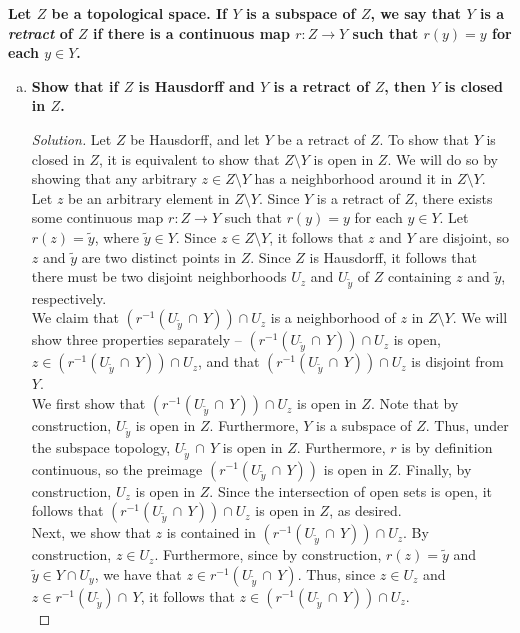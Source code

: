 \documentclass[11pt]{article}
\newenvironment{solution}
  {\renewcommand\qedsymbol{$\blacksquare$}\begin{proof}[Solution]}
  {\end{proof}}
\begin{document}
\textbf{Let $Z$ be a topological space. If $Y$ is a subspace of $Z$, we say that $Y$ is a \textit{retract} of $Z$ if there is a continuous map $r\colon Z \rightarrow Y$ such that $r(y) = y$ for each $y \in Y$.}
\begin{enumerate}[a)]
    \item \textbf{Show that if $Z$ is Hausdorff and $Y$ is a retract of $Z$, then $Y$ is closed in $Z$.}
    \begin{solution}
    Let $Z$ be Hausdorff, and let $Y$ be a retract of $Z$. To show that $Y$ is closed in $Z$, it is equivalent to show that $Z \setminus Y$ is open in $Z$. We will do so by showing that any arbitrary $z \in Z \setminus Y$ has a neighborhood around it in $Z \setminus Y$. \\

    Let $z$ be an arbitrary element in $Z \setminus Y$. Since $Y$ is a retract of $Z$, there exists some continuous map $r\colon Z \rightarrow Y$ such that $r(y) = y$ for each $y \in Y$. Let $r(z) = \tilde{y}$, where $\tilde{y} \in Y$. 
    Since $z \in Z \setminus Y$, it follows that $z$ and $Y$ are disjoint, so $z$ and $\tilde{y}$ are two distinct points in $Z$. Since $Z$ is Hausdorff, 
    it follows that there must be two disjoint neighborhoods $U_z$ and $U_{\tilde{y}}$ of $Z$ containing $z$ and $\tilde{y}$, respectively. \\

    We claim that $(r^{-1}(U_{\tilde{y}} \, \cap \, Y)) \cap U_z$ is a neighborhood of $z$ in $Z \setminus Y$. We will show three properties separately --  $(r^{-1}(U_{\tilde{y}} \, \cap \, Y)) \cap U_z$ is open, $z \in (r^{-1}(U_{\tilde{y}} \, \cap \, Y)) \cap U_z$, and that  $(r^{-1}(U_{\tilde{y}} \, \cap \, Y)) \cap U_z$ is disjoint from $Y$. \\

    We first show that $(r^{-1}(U_{\tilde{y}} \,\cap \, Y)) \cap U_z$ is open in $Z$. Note that by construction, $U_{\tilde{y}}$ is open in $Z$. Furthermore, $Y$ is a subspace of $Z$. Thus, under the subspace topology, $U_{\tilde{y}} \, \cap \, Y$ is open in $Z$. Furthermore,
    $r$ is by definition continuous, so the preimage $(r^{-1}(U_{\tilde{y}} \, \cap \, Y))$ is open in $Z$. Finally, by construction, $U_z$ is open in $Z$. Since the intersection of open sets is open, it follows that
    $(r^{-1}(U_{\tilde{y}} \, \cap \, Y)) \cap U_z$ is open in $Z$, as desired. \\

    Next, we show that $z$ is contained in $(r^{-1}(U_{\tilde{y}} \, \cap \, Y)) \cap U_z$. By construction, $z \in U_z$. Furthermore, since by construction, $r(z) = \tilde{y}$ and $\tilde{y} \in Y \cap U_y$, we have that
    $z \in r^{-1}(U_{\tilde{y}} \, \cap \, Y)$. Thus, since $z \in U_z$ and $z \in r^{-1}(U_{\tilde{y}}) \cap \, Y$, it follows that $z \in (r^{-1}(U_{\tilde{y}} \, \cap \, Y)) \cap U_z$. \\


\end{solution}
\end{enumerate}
\end{document}
